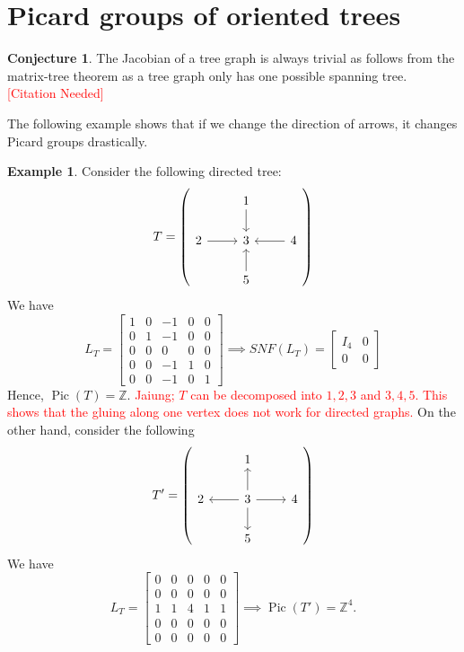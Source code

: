 \documentclass[11pt,reqno]{amsart}
\DeclareMathOperator{\Pic}{Pic}
\theoremstyle{definition}
\newtheorem{myeg}[mydef]{\textbf{Example}}
\newtheorem{conj}[mydef]{\textbf{Conjecture}}
\theoremstyle{plain}
\begin{document}
\section{Picard groups of oriented trees}

	\begin{conj}
	The Jacobian of a tree graph is always trivial as follows from the matrix-tree theorem as a
	tree graph only has one possible spanning tree. \textcolor{red}{[Citation Needed]}
\end{conj}

The following example shows that if we change the direction of arrows, it changes Picard groups drastically.

\begin{myeg}
Consider the following directed tree:
\begin{equation}
T=\left(\begin{tikzcd}
	& 1 \arrow[d] & \\
2 \arrow[r]& 3 & 4 \arrow[l]\\
& 5 \arrow[u] &
\end{tikzcd} \right)
\end{equation}
We have
\[
L_T = \begin{bmatrix}
 1& 0& -1&0 &0 \\
 0 & 1 & -1 & 0 &0\\
 0& 0& 0& 0 &0\\
 0& 0&-1&1 & 0\\
 0& 0&-1&0 & 1
\end{bmatrix} \implies SNF(L_T)=\left[\begin{array}{c|c}
I_4 & 0 \\ \hline
0 & 0
\end{array}\right]
\]
Hence, $\Pic(T)=\mathbb{Z}$. \textcolor{red}{Jaiung; $T$ can be decomposed into $1,2,3$ and $3,4,5$. This shows that the gluing along one vertex does not work for directed graphs.} On the other hand, consider the following
\begin{equation}
T'=\left(\begin{tikzcd}
		& 1 & \\
		2 & 3 \arrow[u] \arrow[r]\arrow[l] \arrow[d]& 4 \\
		& 5  &
	\end{tikzcd} \right)
\end{equation}
We have
\[
L_T = \begin{bmatrix}
	0& 0& 0&0 &0 \\
	0 & 0 & 0 & 0 &0\\
	1& 1& 4& 1 &1\\
	0& 0&0&0 & 0\\
	0& 0&0&0 & 0
\end{bmatrix} \implies \Pic(T')=\mathbb{Z}^4.
\]
\end{myeg}
\end{document}
